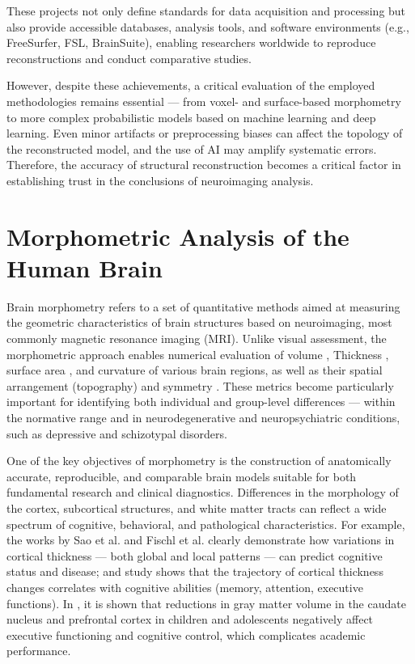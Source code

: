 \documentclass[default]{subfiles}
\begin{document}
These projects not only define standards for data acquisition and processing but also provide accessible databases,
analysis tools, and software environments (e.g., FreeSurfer, FSL, BrainSuite), enabling researchers worldwide to
reproduce reconstructions and conduct comparative studies.

However, despite these achievements, a critical evaluation of the employed methodologies remains essential — from
voxel- and surface-based morphometry to more complex probabilistic models based on machine learning and deep learning.
Even minor artifacts or preprocessing biases can affect the topology of the reconstructed model, and the use of AI may
amplify systematic errors. Therefore, the accuracy of structural reconstruction becomes a critical factor in
establishing trust in the conclusions of neuroimaging analysis.

\section{Morphometric Analysis of the Human Brain}

Brain morphometry refers to a set of quantitative methods aimed at measuring the geometric characteristics of brain
structures based on neuroimaging, most commonly magnetic resonance imaging (MRI). Unlike visual assessment, the
morphometric approach enables numerical evaluation of volume \cite{upadhyay_2014, fischl_2012}, Thickness
\cite{upadhyay_2014, fischl_2000, fischl_2012}, surface area \cite{desikan_2006, fischl_2012, fischl_2004}, and
curvature \cite{fischl_2012, fischl_2000} of various brain regions, as well as their spatial arrangement (topography)
\cite{desikan_2006, fischl_2008, fischl_1999} and symmetry \cite{desikan_2006, greve_2013, fischl_2004}. These metrics
become particularly important for identifying both individual and group-level differences — within the normative range
and in neurodegenerative and neuropsychiatric conditions, such as depressive \cite{van_2013} and schizotypal disorders.

One of the key objectives of morphometry is the construction of anatomically accurate, reproducible, and comparable
brain models suitable for both fundamental research and clinical diagnostics. Differences in the morphology of the
cortex, subcortical structures, and white matter tracts can reflect a wide spectrum of cognitive, behavioral, and
pathological characteristics. For example, the works by Sao et al. \cite{cao_2023} and Fischl et al. \cite{fischl_2000}
clearly demonstrate how variations in cortical thickness — both global and local patterns — can predict cognitive
status and disease; and study \cite{shaw_2006} shows that the trajectory of cortical thickness changes correlates with
cognitive abilities (memory, attention, executive functions). In \cite{jagger_2018}, it is shown that reductions in
gray matter volume in the caudate nucleus and prefrontal cortex in children and adolescents negatively affect executive
functioning and cognitive control, which complicates academic performance.
\end{document}
